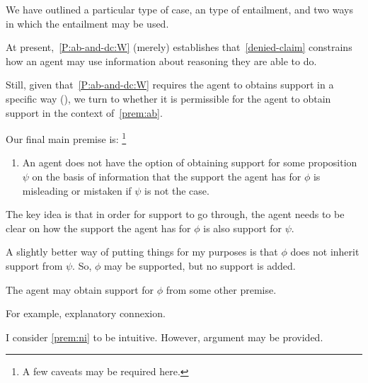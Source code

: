 \begin{note}
  We have outlined a particular type of case, an type of entailment, and two ways in which the entailment may be used.

  At present,~\ref{P:ab-and-dc:W} (merely) establishes that~\ref{denied-claim} constrains how an agent may use information about reasoning they are able to do.
  

  Still, given that~\ref{P:ab-and-dc:W} requires the agent to obtains support in a specific way (\AR{}), we turn to whether it is permissible for the agent to obtain support in the context of~\ref{prem:ab}.
\end{note}

\begin{note}[Inertia]
  Our final main premise is:\nolinebreak
  \footnote{
    A few caveats may be required here.
  }
  \begin{enumerate}[label=\nI{}, ref=\nI{}]
  \item\label{prem:ni} An agent does not have the option of obtaining support for some proposition \(\psi\) on the basis of information that the support the agent has for \(\phi\) is misleading or mistaken if \(\psi\) is not the case.
  \end{enumerate}

  The key idea is that in order for support to go through, the agent needs to be clear on how the support the agent has for \(\phi\) is also support for \(\psi\).

  {
    \color{red}
    A slightly better way of putting things for my purposes is that \(\phi\) does not inherit support from \(\psi\).
    So, \(\phi\) may be supported, but no support is added.
  }

  {
    \color{red}
    The agent may obtain support for \(\phi\) from some other premise.
  }

  For example, explanatory connexion.


  I consider \ref{prem:ni} to be intuitive.
  However, argument may be provided.
\end{note}

